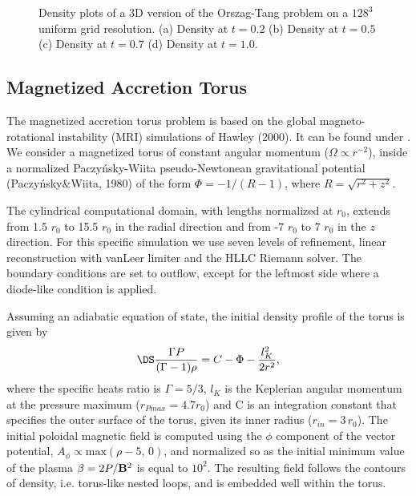 \begin{figure}[!ht]
\begin{center}
\caption{
  Density plots of a 3D version of the Orszag-Tang problem on a $128^3$ uniform grid resolution. (a) Density at $t=0.2$ (b) Density at $t=0.5$
 (c) Density at $t=0.7$ (d) Density at $t=1.0$.  
}
\end{center}
\end{figure}




\clearpage
\subsection{Magnetized Accretion Torus}
\label{Sec:SimulationAccretionTorus}

The magnetized accretion torus problem is based on the global magneto-rotational instability (MRI)
simulations of Hawley (2000). It can be found under .
We consider a magnetized torus of constant angular
momentum ($\Omega\propto r^{-2}$), inside a normalized Paczy\'nsky-Wiita pseudo-Newtonean
gravitational potential (Paczy\'nsky\&Wiita, 1980) of the form $\Phi=-1/(R-1)$, where
$R=\sqrt{r^2+z^2}$.

The cylindrical computational domain, with lengths normalized at $r_0$, 
extends from 1.5 $r_0$ to 15.5 $r_0$ in the radial direction and from -7 $r_0$
to 7 $r_0$ in the $z$ direction. For this specific simulation we use seven levels of
refinement, linear reconstruction with vanLeer limiter and the HLLC Riemann solver.  
The boundary conditions are set to outflow, except for
the leftmost side where a diode-like condition is applied.

Assuming an adiabatic equation of state, the initial density profile of the torus is given by
%
\begin{equation}
\DS \frac{\Gamma P}{(\Gamma-1)\rho} = C - \Phi -\frac{l_K^2}{2r^2},
\end{equation}
%
where the specific heats ratio is $\Gamma=5/3$, $l_K$ is the Keplerian
angular momentum at the pressure maximum ($r_{Pmax}=4.7 r_0$) and C is an
integration constant that specifies the outer surface of the torus,
given its inner radius ($r_{in}=3\,r_0$). The initial poloidal magnetic field 
is computed using the $\phi$ component of the vector potential,
$A_{\phi} \propto \textrm{max}(\rho-5,\,0)$, and normalized so as the initial
minimum value of the plasma $\beta=2P/{\bf B}^2$ is equal to $10^2$. The resulting field
follows the contours of density, i.e. torus-like nested loops, and is embedded
well within the torus.

